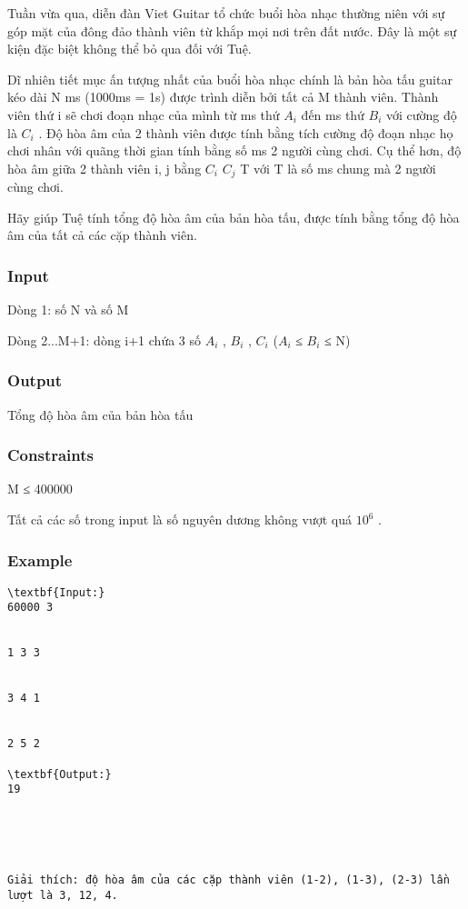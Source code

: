 



   Tuần vừa qua, diễn đàn Viet Guitar tổ chức buổi hòa nhạc thường niên với sự góp mặt của đông đảo thành viên từ khắp mọi nơi trên đất nước. Đây là một sự kiện đặc biệt không thể bỏ qua đối với Tuệ.  

   Dĩ nhiên tiết mục ấn tượng nhất của buổi hòa nhạc chính là bản hòa tấu guitar kéo dài N ms (1000ms = 1s) được trình diễn bởi tất cả M thành viên. Thành viên thứ i sẽ chơi đoạn nhạc của mình từ ms thứ $A_{i}$   đến ms thứ $B_{i}$   với cường độ là $C_{i}$   . Độ hòa âm của 2 thành viên được tính bằng tích cường độ đoạn nhạc họ chơi nhân với quãng thời gian tính bằng số ms 2 người cùng chơi. Cụ thể hơn, độ hòa âm giữa 2 thành viên i, j bằng $C_{i}$   $C_{j}$   T với T là số ms chung mà 2 người cùng chơi.  

   Hãy giúp Tuệ tính tổng độ hòa âm của bản hòa tấu, được tính bằng tổng độ hòa âm của tất cả các cặp thành viên.  

\subsubsection{   Input  }

   Dòng 1: số N và số M   


   Dòng 2...M+1: dòng i+1 chứa 3 số $A_{i}$   , $B_{i}$   , $C_{i}$   ($A_{i}$   ≤ $B_{i}$   ≤ N)  

\subsubsection{   Output  }

   Tổng độ hòa âm của bản hòa tấu  

\subsubsection{   Constraints  }

   M ≤ 400000  

   Tất cả các số trong input là số nguyên dương không vượt quá $10^{6}$   .  

\subsubsection{   Example  }
\begin{verbatim}
\textbf{Input:}
60000 3


1 3 3


3 4 1


2 5 2

\textbf{Output:}
19





Giải thích: độ hòa âm của các cặp thành viên (1-2), (1-3), (2-3) lần lượt là 3, 12, 4. \end{verbatim}
